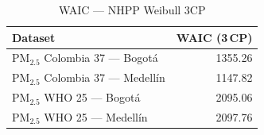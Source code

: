 \begin{table}[htbp]
\centering
\caption{WAIC --- NHPP Weibull 3CP}
\label{tab:nhpp_waic_3cp}
\begin{tabular}{lr}
\toprule
Dataset & WAIC (3\,CP) \\
\midrule
PM$_{2.5}$ Colombia 37 --- Bogot\'{a} & 1355.26 \\
PM$_{2.5}$ Colombia 37 --- Medell\'{i}n & 1147.82 \\
PM$_{2.5}$ WHO 25 --- Bogot\'{a} & 2095.06 \\
PM$_{2.5}$ WHO 25 --- Medell\'{i}n & 2097.76 \\
\bottomrule
\end{tabular}
\end{table}
